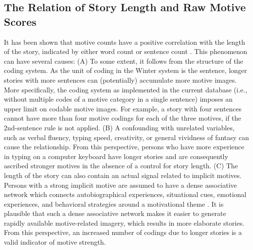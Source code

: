 \documentclass[man,a4paper,mask]{apa6}\usepackage[]{graphicx}\usepackage[]{color}
\begin{document}
\subsection{The Relation of Story Length and Raw Motive Scores}

It has been shown that motive counts have a positive correlation with the length of the story, indicated by either word count or sentence count \parencite{pang_ContentCodingMethods_2010,schultheiss_MeasuringImplicitMotives_2007}. This phenomenon can have several causes: (A) To some extent, it follows from the structure of the coding system. As the unit of coding in the Winter system is the sentence, longer stories with more sentences can (potentially) accumulate more motive images. More specifically, the coding system as implemented in the current database (i.e., without multiple codes of a motive category in a single sentence) imposes an upper limit on codable motive images. For example, a story with four sentences cannot have more than four motive codings for each of the three motives, if the 2nd-sentence rule is not applied.
(B) A confounding with unrelated variables, such as verbal fluency, typing speed, creativity, or general vividness of fantasy can cause the relationship. From this perspective, persons who have more experience in typing on a computer keyboard have longer stories and are consequently ascribed stronger motives in the absence of a control for story length.
(C) The length of the story can also contain an actual signal related to implicit motives. Persons with a strong implicit motive are assumed to have a dense associative network which connects autobiographical experiences, situational cues, emotional experiences, and behavioral strategies around a motivational theme \parencite{schultheiss_reliability_2008,mcclelland_human_1987}. It is plausible that such a dense associative network makes it easier to generate rapidly available motive-related imagery, which results in more elaborate stories. From this perspective, an increased number of codings due to longer stories is a valid indicator of motive strength.
\end{document}
